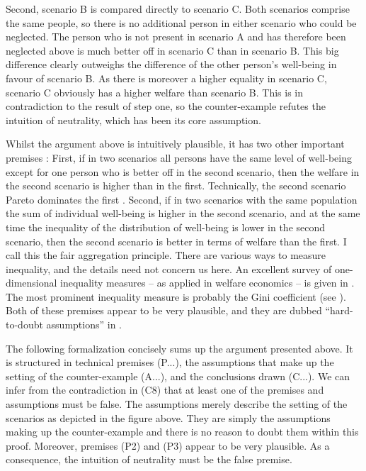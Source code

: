 Second, scenario B is compared directly to scenario C. Both scenarios comprise the same people, so there is no additional person in either scenario who could be neglected. The person who is not present in scenario A and has therefore been neglected above is much better off in scenario C than in scenario B. This big difference clearly outweighs the difference of the other person’s well-being in favour of scenario B. As there is moreover a higher equality in scenario C, scenario C obviously has a higher welfare than scenario B. This is in contradiction to the result of step one, so the counter-example refutes the intuition of neutrality, which has been its core assumption.  

Whilst the argument above is intuitively plausible, it has two other important premises \cite[p.~177f]{broome_2012}: First, if in two scenarios all persons have the same level of well-being except for one person who is better off in the second scenario, then the welfare in the second scenario is higher than in the first. Technically, the second scenario Pareto dominates the first \cite{osborne_1997}. Second, if in two scenarios with the same population the sum of individual well-being is higher in the second scenario, and at the same time the inequality of the distribution of well-being is lower in the second scenario, then the second scenario is better in terms of welfare than the first. I call this the fair aggregation principle. There are various ways to measure inequality, and the details need not concern us here. An excellent survey of one-dimensional inequality measures – as applied in welfare economics – is given in . The most prominent inequality measure is probably the Gini coefficient (see ). Both of these premises appear to be very plausible, and they are dubbed “hard-to-doubt assumptions” in .  

The following formalization concisely sums up the argument presented above. It is structured in technical premises (P...), the assumptions that make up the setting of the counter-example (A...), and the conclusions drawn (C...). We can infer from the contradiction in (C8) that at least one of the premises and assumptions must be false. The assumptions merely describe the setting of the scenarios as depicted in the figure above. They are simply the assumptions making up the counter-example and there is no reason to doubt them within this proof. Moreover, premises (P2) and (P3) appear to be very plausible. As a consequence, the intuition of neutrality must be the false premise.  

